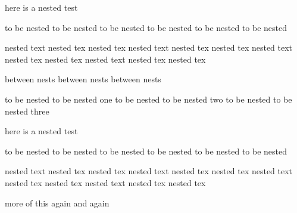 here is a nested test
\begin{one}
	to be nested to be nested
	to be nested to be nested
	to be nested to be nested
	\begin{two}
		nested text nested tex nested tex
		nested text nested tex nested tex
		nested text nested tex nested tex
		nested text nested tex nested tex
	\end{two}
\end{one}
between nests
between nests
between nests
\begin{one}
	to be nested to be nested one
	to be nested to be nested       two
	to be nested to be nested           three
\end{one}
here is a nested test
\begin{one}
	to be nested to be nested
	to be nested to be nested
	to be nested to be nested
	\begin{two}
		nested text nested tex nested tex
		nested text nested tex nested tex
		nested text nested tex nested tex
		nested text nested tex nested tex
	\end{two}
\end{one}
more
of this
again
and again
